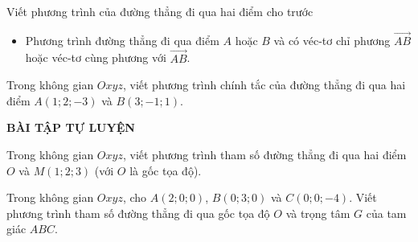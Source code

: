 \begin{dang}{Viết phương trình của đường thẳng đi qua hai điểm cho trước}
\begin{itemize}
\item Phương trình đường thẳng đi qua  điểm $A$ hoặc $B$ và có véc-tơ chỉ phương $\overrightarrow{AB}$ hoặc véc-tơ cùng phương với $\overrightarrow{AB}$.

\end{itemize}
\end{dang}
\begin{vd}%
Trong không gian $Oxyz$, viết phương trình chính tắc của đường thẳng đi qua hai điểm $A(1;2;-3)$ và $B(3;-1;1)$.
\end{vd}
\begin{center}
\textbf{BÀI TẬP TỰ LUYỆN}
\end{center}

\begin{bt}%
Trong không gian $Oxyz$, viết phương trình tham số đường thẳng đi qua hai điểm $O$ và $M(1;2;3)$ (với $O$ là gốc tọa độ).
\end{bt}
\begin{bt}%
	Trong không gian $Oxyz$, cho $A(2;0;0)$, $B(0;3;0)$ và $C(0;0;-4)$. Viết phương trình tham số đường thẳng đi qua gốc tọa độ $O$ và trọng tâm $G$ của tam giác $ABC$.
\end{bt}

